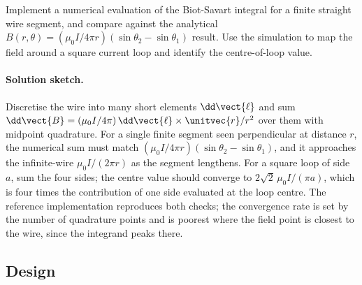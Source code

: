 \begin{exercise}
Implement a numerical evaluation of the Biot-Savart integral for a
finite straight wire segment, and compare against the analytical
$B(r,\theta) = (\mu_{0} I/4\pi r)(\sin\theta_{2}-\sin\theta_{1})$
result. Use the simulation to map the field around a square current
loop and identify the centre-of-loop value.

\paragraph{Solution sketch.} Discretise the wire into many short elements
$\dd\vect{\ell}$ and sum $\dd\vect{B} = (\mu_0 I/4\pi)\,\dd\vect{\ell}
\times\unitvec{r}/r^2$ over them with midpoint quadrature. For a single
finite segment seen perpendicular at distance $r$, the numerical sum
must match $(\mu_0 I/4\pi r)(\sin\theta_2 - \sin\theta_1)$, and it
approaches the infinite-wire $\mu_0 I/(2\pi r)$ as the segment
lengthens. For a square loop of side $a$, sum the four sides; the centre
value should converge to $2\sqrt{2}\,\mu_0 I/(\pi a)$, which is four
times the contribution of one side evaluated at the loop centre. The
reference implementation 
reproduces both checks; the convergence rate is set by the number of
quadrature points and is poorest where the field point is closest to the
wire, since the integrand peaks there.
\end{exercise}

\subsection*{Design}

